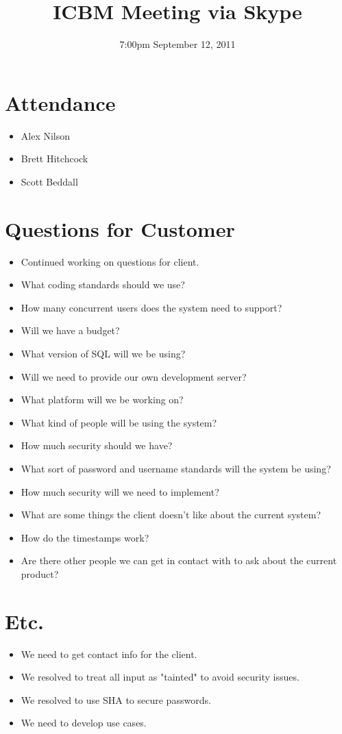 \documentclass{article}
\begin{document}
\title{ICBM Meeting via Skype}
\date{7:00pm September 12, 2011}
\maketitle

\section{Attendance}
\begin{itemize}
\item Alex Nilson
\item Brett Hitchcock
\item Scott Beddall
\end{itemize}

\section{Questions for Customer}
\begin{itemize}
\item Continued working on questions for client.
\item What coding standards should we use?
\item How many concurrent users does the system need to support?
\item Will we have a budget?
\item What version of SQL will we be using?
\item Will we need to provide our own development server?
\item What platform will we be working on?
\item What kind of people will be using the system?
\item How much security should we have?
\item What sort of password and username standards will the system be using?
\item How much security will we need to implement?
\item What are some things the client doesn't like about the current system?
\item How do the timestamps work?
\item Are there other people we can get in contact with to ask about the current product?
\end{itemize}

\section{Etc.}
\begin{itemize}
\item We need to get contact info for the client.
\item We resolved to treat all input as "tainted" to avoid security issues.
\item We resolved to use SHA to secure passwords.
\item We need to develop use cases.
\end{itemize}
\end{document}
